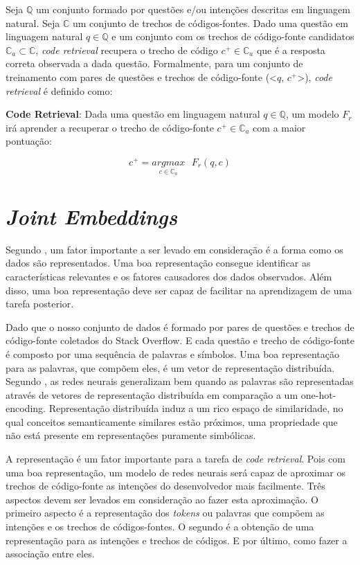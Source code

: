 Seja $\mathbb{Q}$ um conjunto formado por questões e/ou intenções descritas em linguagem natural. Seja $\mathbb{C}$ um conjunto de trechos de códigos-fontes. Dado uma questão em linguagem natural $q \in \mathbb{Q}$ e um conjunto com os trechos de código-fonte candidatos $\mathbb{C}_{a} \subset \mathbb{C}$, \textit{code retrieval} recupera o trecho de código $c^{+} \in \mathbb{C}_{a}$ que é a resposta correta observada a dada questão. Formalmente, para um conjunto de treinamento com pares de questões e trechos de código-fonte (<$q$, $c^{+}$>), \textit{code retrieval} é definido como:

\textbf{Code Retrieval}: Dada uma questão em linguagem natural $q \in \mathbb{Q}$, um modelo $F_{r}$ irá aprender a recuperar o trecho de código-fonte $c^{+} \in \mathbb{C}_{a}$ com a maior pontuação:

\begin{equation}\label{eq:code-retrieval}
c^{+} = \underset{c \in \mathbb{C}_{a}}{argmax}\text{ } F_{r}(q , c)
\end{equation}

\section{\textit{Joint Embeddings}}

Segundo \cite{Goodfellow-et-al-2016:representation-learning}, um fator importante a ser levado em consideração é a forma como os dados são representados. Uma boa representação consegue identificar as características relevantes e os fatores causadores dos dados observados. Além disso, uma boa representação deve ser capaz de facilitar na aprendizagem de uma tarefa posterior.

Dado que o nosso conjunto de dados é formado por pares de questões e trechos de código-fonte coletados do Stack Overflow. E cada questão e trecho de código-fonte é composto por uma sequência de palavras e símbolos.
Uma boa representação para as palavras, que compõem eles, é um vetor de representação distribuída. Segundo \cite{Goodfellow-et-al-2016:representation-learning}, as redes neurais generalizam bem quando as palavras são representadas através de vetores de representação distribuída em comparação a um \gls{one-hot-encoding}. Representação distribuída induz a um rico espaço de similaridade, no qual conceitos semanticamente similares estão próximos, uma propriedade que não está presente em representações puramente simbólicas.

A representação é um fator importante para a tarefa de \textit{code retrieval}. Pois com uma boa representação, um modelo de redes neurais será capaz de aproximar os trechos de código-fonte as intenções do desenvolvedor mais facilmente. Três aspectos devem ser levados em consideração ao fazer esta aproximação. O primeiro aspecto é a representação dos \textit{tokens} ou palavras que compõem as intenções e os trechos de códigos-fontes. O segundo é a obtenção de uma representação para as intenções e trechos de códigos. E por último, como fazer a associação entre eles.

